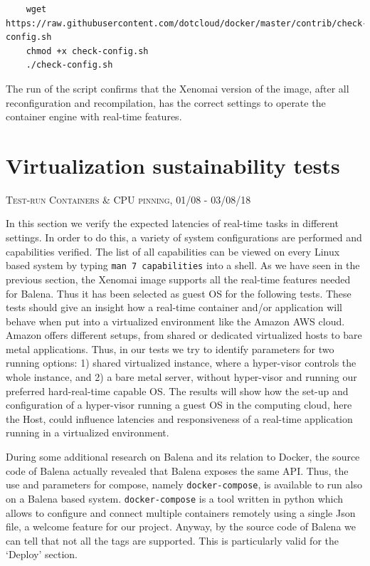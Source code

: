 \documentclass[]{scrartcl}
\begin{document}
\begin{verbatim}
	wget https://raw.githubusercontent.com/dotcloud/docker/master/contrib/check-config.sh
	chmod +x check-config.sh
	./check-config.sh
\end{verbatim}

The run of the script confirms that the Xenomai version of the image, after all reconfiguration and recompilation, has the correct settings to operate the container engine with real-time features.

\section{Virtualization sustainability tests}
\label{sec:virtsust}
{\small\textsc{Test-run Containers \& CPU pinning, 01/08 - 03/08/18} \bigskip}

In this section we verify the expected latencies of real-time tasks in different settings. In order to do this, a variety of system configurations are performed and capabilities verified. 
The list of all capabilities can be viewed on every Linux based system by typing \texttt{man 7 capabilities} into a shell. 
As we have seen in the previous section, the Xenomai image supports all the real-time features needed for Balena. Thus it has been selected as guest OS for the following tests.
These tests should give an insight how a real-time container and/or application will behave when put into a virtualized environment like the Amazon AWS cloud. Amazon offers different setups, from shared or dedicated virtualized hosts to bare metal applications. Thus, in our tests we try to identify parameters for two running options: 1) shared virtualized instance, where a hyper-visor controls the whole instance, and 2) a bare metal server, without hyper-visor and running our preferred hard-real-time capable OS.
The results will show how the set-up and configuration of a hyper-visor running a guest OS in the computing cloud, here the Host, could influence latencies and responsiveness of a real-time application running in a virtualized environment. 

During some additional research on Balena and its relation to Docker, the source code of Balena actually revealed that Balena exposes the same API. Thus, the use and parameters for compose, namely \texttt{docker-compose}, is available to run also on a Balena based system.
\texttt{docker-compose} is a tool written in python which allows to configure and connect multiple containers remotely using a single Json file, a welcome feature for our project.
Anyway, by the source code of Balena we can tell that not all the tags are supported. This is particularly valid for the `Deploy' section. 
\end{document}
